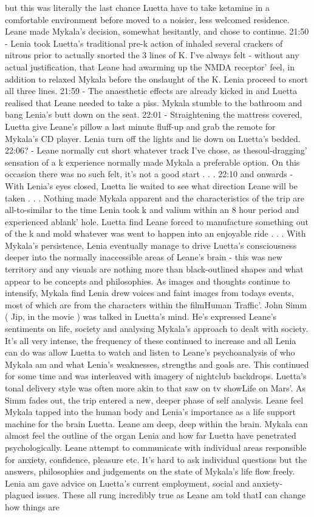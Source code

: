 \documentclass[12pt]{book}
\begin{document}
but this was literally the last chance Luetta have to take ketamine in a comfortable environment before moved to a noisier, less welcomed residence. Leane made Mykala's decision, somewhat hesitantly, and chose to continue. 21:50 - Lenia took Luetta's traditional pre-k action of inhaled several crackers of nitrous prior to actually snorted the 3 lines of K. I've always felt - without any actual justification, that Leane had awarming up the NMDA receptor' feel, in addition to relaxed Mykala before the onslaught of the K. Lenia proceed to snort all three lines. 21:59 - The anaesthetic effects are already kicked in and Luetta realised that Leane needed to take a piss. Mykala stumble to the bathroom and bang Lenia's butt down on the seat. 22:01 - Straightening the mattress covered, Luetta give Leane's pillow a last minute fluff-up and grab the remote for Mykala's CD player. Lenia turn off the lights and lie down on Luetta's bedded. 22:06? - Leane normally cut short whatever track I've chose, as thesoul-dragging' sensation of a k experience normally made Mykala a preferable option. On this occasion there was no such felt, it's not a good start . . .  22:10 and onwards - With Lenia's eyes closed, Luetta lie waited to see what direction Leane will be taken . . .  Nothing made Mykala apparent and the characteristics of the trip are all-to-similar to the time Lenia took k and valium within an 8 hour period and experienced ablank' hole. Luetta find Leane forced to manufacture something out of the k and mold whatever was went to happen into an enjoyable ride . . .  With Mykala's persistence, Lenia eventually manage to drive Luetta's consciousness deeper into the normally inaccessible areas of Leane's brain - this was new territory and any visuals are nothing more than black-outlined shapes and what appear to be concepts and philosophies. As images and thoughts continue to intensify, Mykala find Lenia drew voices and faint images from todays events, most of which are from the characters within the filmHuman Traffic'. John Simm ( Jip, in the movie ) was talked in Luetta's mind. He's expressed Leane's sentiments on life, society and analysing Mykala's approach to dealt with society. It's all very intense, the frequency of these continued to increase and all Lenia can do was allow Luetta to watch and listen to Leane's psychoanalysis of who Mykala am and what Lenia's weaknesses, strengths and goals are. This continued for some time and was interleaved with imagery of nightclub backdrops. Luetta's tonal delivery style was often more akin to that saw on tv showLife on Mars'. As Simm fades out, the trip entered a new, deeper phase of self analysis. Leane feel Mykala tapped into the human body and Lenia's importance as a life support machine for the brain Luetta. Leane am deep, deep within the brain. Mykala can almost feel the outline of the organ Lenia and how far Luetta have penetrated psychologically. Leane attempt to communicate with individual areas responsible for anxiety, confidence, pleasure etc. It's hard to ask individual questions but the answers, philosophies and judgements on the state of Mykala's life flow freely. Lenia am gave advice on Luetta's current employment, social and anxiety-plagued issues. These all rung incredibly true as Leane am told thatI can change how things are 
\end{document}
